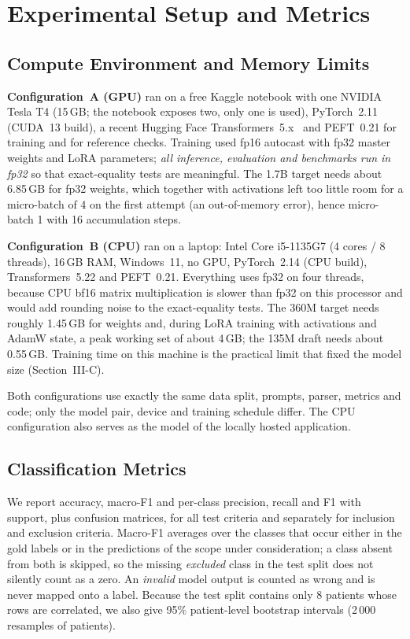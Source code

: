 \section{Experimental Setup and Metrics}

\subsection{Compute Environment and Memory Limits}
\textbf{Configuration~A (GPU)} ran on a free Kaggle notebook with one NVIDIA Tesla T4 (15\,GB; the notebook exposes two, only one is used), PyTorch~2.11 (CUDA~13 build), a recent Hugging Face Transformers~5.x~\cite{wolf2020transformers} and PEFT~0.21 for training and for reference checks. Training used fp16 autocast with fp32 master weights and LoRA parameters; \emph{all inference, evaluation and benchmarks run in fp32} so that exact-equality tests are meaningful. The 1.7B target needs about 6.85\,GB for fp32 weights, which together with activations left too little room for a micro-batch of 4 on the first attempt (an out-of-memory error), hence micro-batch 1 with 16 accumulation steps.

\textbf{Configuration~B (CPU)} ran on a laptop: Intel Core i5-1135G7 (4 cores / 8 threads), 16\,GB RAM, Windows~11, no GPU, PyTorch~2.14 (CPU build), Transformers~5.22 and PEFT~0.21. Everything uses fp32 on four threads, because CPU bf16 matrix multiplication is slower than fp32 on this processor and would add rounding noise to the exact-equality tests. The 360M target needs roughly 1.45\,GB for weights and, during LoRA training with activations and AdamW state, a peak working set of about 4\,GB; the 135M draft needs about 0.55\,GB. Training time on this machine is the practical limit that fixed the model size (Section~III-C).

Both configurations use exactly the same data split, prompts, parser, metrics and code; only the model pair, device and training schedule differ. The CPU configuration also serves as the model of the locally hosted application.

\subsection{Classification Metrics}
We report accuracy, macro-F1 and per-class precision, recall and F1 with support, plus confusion matrices, for all test criteria and separately for inclusion and exclusion criteria. Macro-F1 averages over the classes that occur either in the gold labels or in the predictions of the scope under consideration; a class absent from both is skipped, so the missing \emph{excluded} class in the test split does not silently count as a zero. An \emph{invalid} model output is counted as wrong and is never mapped onto a label. Because the test split contains only 8 patients whose rows are correlated, we also give 95\% patient-level bootstrap intervals (2\,000 resamples of patients).

